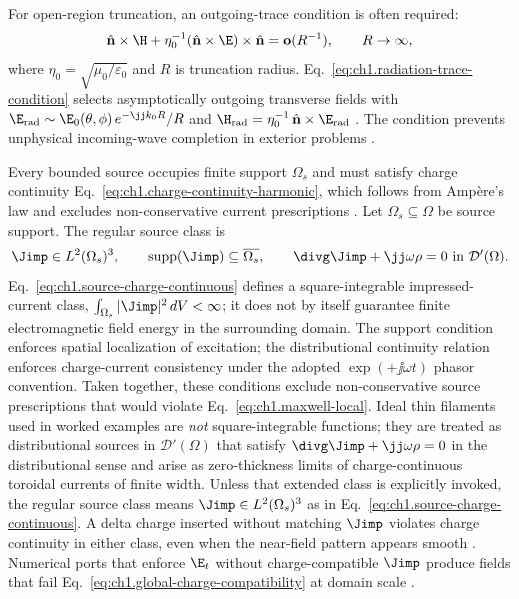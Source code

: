 For open-region truncation, an outgoing-trace condition is often required:
\begin{equation}
\label{eq:ch1.radiation-trace-condition}
\hat{\mathbf{n}}\times\H
+\eta_0^{-1}(\hat{\mathbf{n}}\times\E)\times\hat{\mathbf{n}}
=\mathbf{o}(R^{-1}),\qquad R\to\infty,
\end{equation}
where \(\eta_0=\sqrt{\mu_0/\varepsilon_0}\) and \(R\) is truncation radius.
Eq.~\eqref{eq:ch1.radiation-trace-condition} selects asymptotically outgoing transverse fields with
\(\E_{\mathrm{rad}}\sim \E_0(\theta,\phi)\,e^{-\jj k_0 R}/R\) and
\(\H_{\mathrm{rad}}=\eta_0^{-1}\,\hat{\mathbf{n}}\times\E_{\mathrm{rad}}\)
\cite{stratton1941,sommerfeld1949}. The condition prevents unphysical incoming-wave completion in exterior problems
\cite{harrington2001}.

Every bounded source occupies finite support $\Omega_s$ and must satisfy charge continuity Eq.~\eqref{eq:ch1.charge-continuity-harmonic}, which follows from Amp\`ere's law and excludes non-conservative current prescriptions \cite{maxwell1873,stratton1941}. Let \(\Omega_s\subseteq\Omega\) be source support. The regular source class is
\begin{equation}
\label{eq:ch1.source-charge-continuous}
\Jimp\in L^2(\Omega_s)^3,\qquad
\operatorname{supp}(\Jimp)\subseteq\overline{\Omega_s},\qquad
\divg\Jimp+\jj\omega\rho=0
\ \text{in }\mathcal{D}'(\Omega).
\end{equation}
Eq.~\eqref{eq:ch1.source-charge-continuous} defines a square-integrable impressed-current
class, \(\int_{\Omega_s}|\Jimp|^2\,dV<\infty\); it does not by itself guarantee finite
electromagnetic field energy in the surrounding domain. The support condition enforces spatial
localization of excitation; the distributional continuity relation enforces
charge-current consistency under the adopted \(\exp(+\jj\omega t)\) phasor
convention. Taken together, these conditions exclude non-conservative source
prescriptions that would violate Eq.~\eqref{eq:ch1.maxwell-local}. Ideal thin filaments used in worked examples are \emph{not} square-integrable functions; they are treated as distributional sources in \(\mathcal{D}'(\Omega)\) that satisfy \(\divg\Jimp+\jj\omega\rho=0\) in the distributional sense and arise as zero-thickness limits of charge-continuous toroidal currents of finite width. Unless that extended class is explicitly invoked, the regular source class means \(\Jimp\in L^2(\Omega_s)^3\) as in Eq.~\eqref{eq:ch1.source-charge-continuous}. A delta charge inserted without matching \(\Jimp\) violates charge continuity in either class, even when the near-field pattern appears smooth \cite{stratton1941}. Numerical ports that enforce $\E_t$ without charge-compatible $\Jimp$ produce fields that fail Eq.~\eqref{eq:ch1.global-charge-compatibility} at domain scale \cite{hansen1988}.

